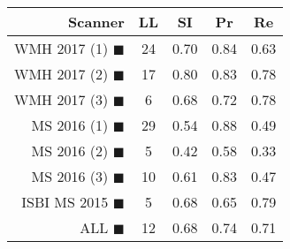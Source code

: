 \begin{tabular}{rcccc}
\toprule
Scanner & LL & SI & Pr & Re \\
\midrule
WMH 2017 (1) {\color[rgb]{ 1.00 0.00 0.00}$\blacksquare$} & 24 & 0.70 & 0.84 & 0.63 \\
WMH 2017 (2) {\color[rgb]{ 1.00 0.50 0.00}$\blacksquare$} & 17 & 0.80 & 0.83 & 0.78 \\
WMH 2017 (3) {\color[rgb]{ 1.00 0.80 0.00}$\blacksquare$} & 6 & 0.68 & 0.72 & 0.78 \\
MS  2016 (1) {\color[rgb]{ 0.20 0.80 0.00}$\blacksquare$} & 29 & 0.54 & 0.88 & 0.49 \\
MS  2016 (2) {\color[rgb]{ 0.00 0.40 1.00}$\blacksquare$} & 5 & 0.42 & 0.58 & 0.33 \\
MS  2016 (3) {\color[rgb]{ 0.60 0.00 1.00}$\blacksquare$} & 10 & 0.61 & 0.83 & 0.47 \\
ISBI MS 2015 {\color[rgb]{ 1.00 0.00 1.00}$\blacksquare$} & 5 & 0.68 & 0.65 & 0.79 \\
\midrule
ALL {\color[rgb]{ 1.00 1.00 1.00}$\blacksquare$} & 12 & 0.68 & 0.74 & 0.71 \\
\bottomrule
\end{tabular}